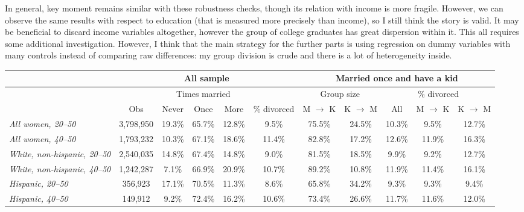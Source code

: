 \documentclass[12pt,letter]{article}
\begin{document}
In general, key moment remains similar with these robustness checks, though its relation with income is more fragile. However, we can observe the same results with respect to education (that is measured more precisely than income), so I still think the story is valid. It may be beneficial to discard income variables altogether, however the group of college graduates has great dispersion within it. This all requires some additional investigation. However, I think that the main strategy for the further parts is using regression on dummy variables with many controls instead of comparing raw differences: my group division is crude and there is a lot of heterogeneity inside. 

\newpage
\begin{landscape}
\begin{table}
\begin{center}
\begin{tabular}{|l|c|c|c|c|c||c|c|c|c|c|}\hline
& \multicolumn{5}{|c||}{\textbf{All sample}}  &  \multicolumn{5}{|c|}{\textbf{Married once and have a kid}}\\\hline
& & \multicolumn{3}{|c|}{Times married} &  & \multicolumn{2}{|c|}{Group size}  & \multicolumn{3}{|c|}{\% divorced}  \\\hline
 &  Obs & \footnotesize Never &  \footnotesize Once &  \footnotesize More & \footnotesize \% divorced  & \footnotesize M $\rightarrow$ K &  \footnotesize K $\rightarrow$ M &  All & \footnotesize M $\rightarrow$ K & \footnotesize K $\rightarrow$ M \\\hline
\emph{All women, 20--50} & \footnotesize 3,798,950 & 19.3\% & 65.7\% & 12.8\% &   9.5\% & 75.5\% & 24.5\% & 10.3\% &  9.5\% & 12.7\% \\
\emph{All women, 40--50} & \footnotesize 1,793,232 & 10.3\% & 67.1\% & 18.6\% &  11.4\% & 82.8\% & 17.2\% & 12.6\% & 11.9\% & 16.3\% \\\hline
\emph{White, non-hispanic, 20--50} &  \footnotesize  2,540,035 & 14.8\% & 67.4\% & 14.8\% &   9.0\% & 81.5\% & 18.5\% &  9.9\% &  9.2\% & 12.7\% \\
\emph{White, non-hispanic, 40--50} &   \footnotesize 1,242,287 &  7.1\% & 66.9\% & 20.9\% &  10.7\% & 89.2\% & 10.8\% & 11.9\% & 11.4\% & 16.1\% \\ \hline
\emph{Hispanic, 20--50} &   \footnotesize 356,923 & 17.1\% & 70.5\% & 11.3\% &   8.6\% & 65.8\% & 34.2\% &  9.3\% &  9.3\% &  9.4\% \\
\emph{Hispanic, 40--50} &   \footnotesize 149,912 &  9.2\% & 72.4\% & 16.2\% &  10.6\% & 73.4\% & 26.6\% & 11.7\% & 11.6\% & 12.0\% \\\hline

\end{tabular}
\end{center}
\end{table}
\end{landscape}
\end{document}
